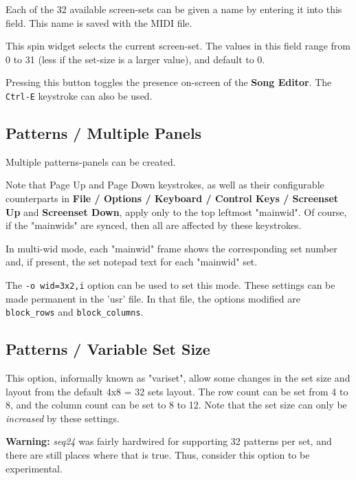    Each of the 32 available screen-sets can be given a name by entering it
   into this field.  This name is saved with the MIDI file.

   This spin widget selects the current screen-set.  The values in this
   field range from 0 to 31 (less if the set-size is a larger value),
   and default to 0.

   Pressing this button toggles the presence on-screen of the
   \textbf{Song Editor}.  The \texttt{Ctrl-E} keystroke can also be used.

\subsection{Patterns / Multiple Panels}
\label{subsec:patterns_panel_multiple}

   Multiple patterns-panels can be created.

   Note that Page Up and Page Down keystrokes, as well as their
   configurable counterparts in
   \textbf{File / Options / Keyboard / Control Keys / Screenset Up}
   and \textbf{Screenset Down}, apply only to the top leftmost "mainwid".
   Of course, if the "mainwids" are synced, then all are affected by these
   keystrokes.

   In multi-wid mode, each "mainwid" frame shows the corresponding set number
   and, if present, the set notepad text for each "mainwid" set.

   The \texttt{-o wid=3x2,i} option can be used to set this mode.
   These settings can be made permanent in the 'usr' file.
   In that file, the options modified are \texttt{block\_rows} and
   \texttt{block\_columns}.

\subsection{Patterns / Variable Set Size}
\label{subsec:patterns_panel_variset}

   This option, informally known as "variset", allow some changes in
   the set size and layout from the default 4x8 = 32 sets layout.
   The row count can be set from 4 to 8, and the column count can be set to 8
   to 12.  Note that the set size can only be \textsl{increased} by these
   settings.

   \textbf{Warning:}
   \textsl{seq24} was fairly hardwired for supporting 32 patterns per
   set, and there are still places where that is true.  Thus,
   consider this option to be experimental.

